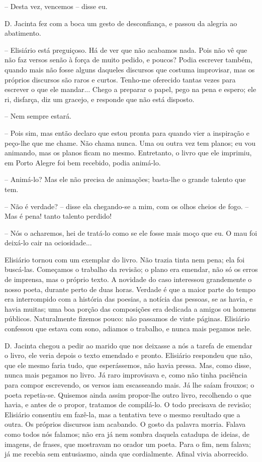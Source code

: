 -- Desta vez, vencemos -- disse eu.

D. Jacinta fez com a boca um gesto de desconfiança, e passou da alegria
ao abatimento.

-- Elisiário está preguiçoso. Há de ver que não acabamos nada. Pois não
vê que não faz versos senão à força de muito pedido, e poucos? Podia
escrever também, quando mais não fosse alguns daqueles discursos que
costuma improvisar, mas os próprios discursos são raros e curtos.
Tenho-me oferecido tantas vezes para escrever o que ele mandar... Chego
a preparar o papel, pego na pena e espero; ele ri, disfarça, diz um
gracejo, e responde que não está disposto.

-- Nem sempre estará.

-- Pois sim, mas então declaro que estou pronta para quando vier a
inspiração e peço-lhe que me chame. Não chama nunca. Uma ou outra vez
tem planos; eu vou animando, mas os planos ficam no mesmo. Entretanto, o
livro que ele imprimiu, em Porto Alegre foi bem recebido, podia
animá-lo.

-- Animá-lo? Mas ele não precisa de animações; basta-lhe o grande
talento que tem.

-- Não é verdade? -- disse ela chegando-se a mim, com os olhos cheios de
fogo. -- Mas é pena! tanto talento perdido!

-- Nós o acharemos, hei de tratá-lo como se ele fosse mais moço que eu.
O mau foi deixá-lo cair na ociosidade...

Elisiário tornou com um exemplar do livro. Não trazia tinta nem pena;
ela foi buscá-las. Começamos o trabalho da revisão; o plano era emendar,
não só os erros de imprensa, mas o próprio texto. A novidade do caso
interessou grandemente o nosso poeta, durante perto de duas horas.
Verdade é que a maior parte do tempo era interrompido com a história das
poesias, a notícia das pessoas, se as havia, e havia muitas; uma boa
porção das composições era dedicada a amigos ou homens públicos.
Naturalmente fizemos pouco: não passamos de vinte páginas. Elisiário
confessou que estava com sono, adiamos o trabalho, e nunca mais pegamos
nele.

D. Jacinta chegou a pedir ao marido que nos deixasse a nós a tarefa de
emendar o livro, ele veria depois o texto emendado e pronto. Elisiário
respondeu que não, que ele mesmo faria tudo, que esperássemos, não havia
pressa. Mas, como disse, nunca mais pegamos no livro. Já raro
improvisava e, como não tinha paciência para compor escrevendo, os
versos iam escasseando mais. Já lhe saíam frouxos; o poeta repetia-se.
Quisemos ainda assim propor-lhe outro livro, recolhendo o que havia, e
antes de o propor, tratamos de compilá-lo. O todo precisava de revisão;
Elisiário consentiu em fazê-la, mas a tentativa teve o mesmo resultado
que a outra. Os próprios discursos iam acabando. O gosto da palavra
morria. Falava como todos nós falamos; não era já nem sombra daquela
catadupa de ideias, de imagens, de frases, que mostravam no orador um
poeta. Para o fim, nem falava; já me recebia sem entusiasmo, ainda que
cordialmente. Afinal vivia aborrecido.

